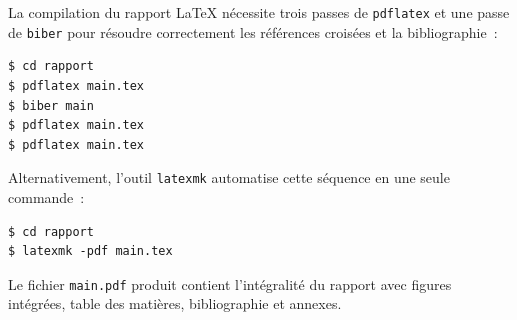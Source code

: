 La compilation du rapport LaTeX n\'ecessite trois passes de \texttt{pdflatex} et une passe de \texttt{biber} pour r\'esoudre correctement les r\'ef\'erences crois\'ees et la bibliographie~:

\begin{lstlisting}[language={}, numbers=none, caption={S\'equence de compilation LaTeX}]
$ cd rapport
$ pdflatex main.tex
$ biber main
$ pdflatex main.tex
$ pdflatex main.tex
\end{lstlisting}

Alternativement, l'outil \texttt{latexmk} automatise cette s\'equence en une seule commande~:

\begin{lstlisting}[language={}, numbers=none, caption={Compilation automatis\'ee via latexmk}]
$ cd rapport
$ latexmk -pdf main.tex
\end{lstlisting}

Le fichier \texttt{main.pdf} produit contient l'int\'egralit\'e du rapport avec figures int\'egr\'ees, table des mati\`eres, bibliographie et annexes.
